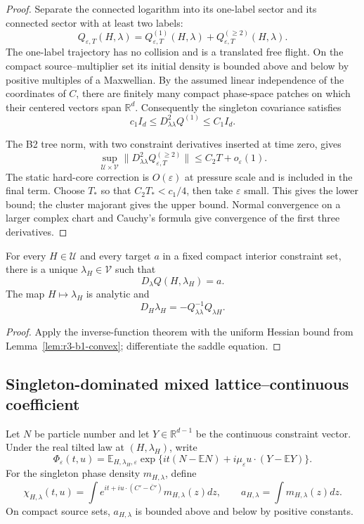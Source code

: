 \begin{proof}
Separate the connected logarithm into its one-label sector and its connected
sector with at least two labels:
\[
 Q_{\varepsilon,T}(H,\lambda)
 =Q_{\varepsilon,T}^{(1)}(H,\lambda)
  +Q_{\varepsilon,T}^{(\ge2)}(H,\lambda).
\]
The one-label trajectory has no collision and is a translated free flight.
On the compact source--multiplier set its initial density is bounded above and
below by positive multiples of a Maxwellian.  By the assumed linear
independence of the coordinates of \(C\), there are finitely many compact
phase-space patches on which their centered vectors span \(\mathbb R^d\).
Consequently the singleton covariance satisfies
\[
 c_1I_d\le D^2_{\lambda\lambda}Q^{(1)}\le C_1I_d.
\]

The B2 tree norm, with two constraint derivatives inserted at time zero,
gives
\[
 \sup_{\mathcal U\times\mathcal V}
 \|D^2_{\lambda\lambda}Q_{\varepsilon,T}^{(\ge2)}\|
 \le C_2T+o_\varepsilon(1).
\]
The static hard-core correction is \(O(\varepsilon)\) at pressure scale and
is included in the final term.  Choose \(T_*\) so that
\(C_2T_*<c_1/4\), then take \(\varepsilon\) small.  This gives the lower
bound; the cluster majorant gives the upper bound.  Normal convergence on a
larger complex chart and Cauchy's formula give convergence of the first three
derivatives.
\end{proof}

\begin{corollary}
\label{cor:r3-b1-saddle}
For every \(H\in\mathcal U\) and every target \(a\) in a fixed compact
interior constraint set, there is a unique \(\lambda_H\in\mathcal V\) such
that
\[
 D_\lambda Q(H,\lambda_H)=a.
\]
The map \(H\mapsto\lambda_H\) is analytic and
\[
 D_H\lambda_H
 =-Q_{\lambda\lambda}^{-1}Q_{\lambda H}.
\]
\end{corollary}

\begin{proof}
Apply the inverse-function theorem with the uniform Hessian bound from
Lemma~\ref{lem:r3-b1-convex}; differentiate the saddle equation.
\end{proof}

\subsection{Singleton-dominated mixed lattice--continuous coefficient}

Let \(N\) be particle number and let \(Y\in\mathbb R^{d-1}\) be the
continuous constraint vector.  Under the real tilted law at
\((H,\lambda_H)\), write
\[
 \Phi_\varepsilon(t,u)
 =\mathbb E_{H,\lambda_H,\varepsilon}
 \exp\{it(N-\mathbb EN)+i\mu_\varepsilon u\cdot(Y-\mathbb EY)\}.
\]
For the singleton phase density \(m_{H,\lambda}\), define
\[
 \chi_{H,\lambda}(t,u)
 =\int e^{it+i u\cdot(C'-\bar C')}
 m_{H,\lambda}(z)dz,
 \qquad
 a_{H,\lambda}=\int m_{H,\lambda}(z)dz.
\]
On compact source sets, \(a_{H,\lambda}\) is bounded above and below by
positive constants.

